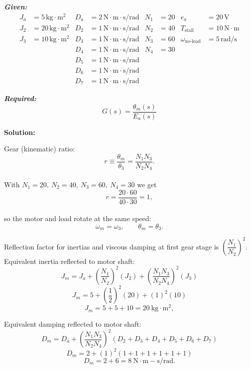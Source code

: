 \documentclass[11pt]{article}
\begin{document}
\vspace{12pt}

\noindent\textbf{\textit{Given:}}
\[
\begin{aligned}
J_a &= 5\, \text{kg}\cdot\text{m}^2 & D_a &= 2\, \text{N}\cdot\text{m}\cdot\text{s/rad} & N_1 &= 20 & e_a &= 20\,\text{V} \\
J_2 &= 20\, \text{kg}\cdot\text{m}^2 & D_2 &= 1\, \text{N}\cdot\text{m}\cdot\text{s/rad} & N_2 &= 40 & T_{\text{stall}} &= 10\,\text{N}\cdot\text{m} \\
J_3 &= 10\, \text{kg}\cdot\text{m}^2 & D_3 &= 1\, \text{N}\cdot\text{m}\cdot\text{s/rad} & N_3 &= 60 & \omega_{\text{no-load}} &= 5\,\text{rad/s} \\
& & D_4 &= 1\, \text{N}\cdot\text{m}\cdot\text{s/rad} & N_4 &= 30 & & \\
& & D_5 &= 1\, \text{N}\cdot\text{m}\cdot\text{s/rad} & & & & \\
& & D_6 &= 1\, \text{N}\cdot\text{m}\cdot\text{s/rad} & & & & \\
& & D_7 &= 1\, \text{N}\cdot\text{m}\cdot\text{s/rad} & & & &
\end{aligned}
\]

\vspace{12pt}

\noindent \textbf{\textit{Required:}}
\[
G(s) = \frac{\theta_m(s)}{E_a(s)}
\]

\vspace{12pt}

\noindent \textbf{Solution:}

Gear (kinematic) ratio:
\[
r \equiv \frac{\theta_m}{\theta_3}=\frac{N_1 N_3}{N_2 N_4}.
\]  \\

With \(N_1=20,\ N_2=40,\ N_3=60,\ N_4=30\) we get
\[
r=\frac{20 \cdot 60}{40 \cdot 30}=1,
\] \\

so the motor and load rotate at the same speed:
\[
\omega_m = \omega_3,\qquad \theta_m = \theta_3.
\]

Reflection factor for inertias and viscous damping at first gear stage is \(\left(\dfrac{N_1}{N_2}\right)^2\). \\

Equivalent inertia reflected to motor shaft:
\[
J_m = J_a + \left(\frac{N_1}{N_2}\right)^2 (J_2) + \left(\frac{N_1 N_3}{N_2 N_4}\right)^2 (J_3)
\]
\[
J_m = 5 + \left(\frac{1}{2}\right)^2 (20) + (1)^2 (10)
\]
\[
J_m = 5 + 5 + 10 = 20\ \mathrm{kg\cdot m^2},
\]

Equivalent damping reflected to motor shaft:
\[
D_m = D_a + \left(\frac{N_1 N_3}{N_2 N_4}\right)^2 (D_2 + D_3 + D_4 + D_5 + D_6 + D_7)
\]
\[
D_m = 2 + (1)^2 (1 + 1 + 1 + 1 + 1 + 1)
\]
\[
D_m = 2 + 6 = 8\ \mathrm{N\cdot m\!-\!s/rad}.
\]
\end{document}

